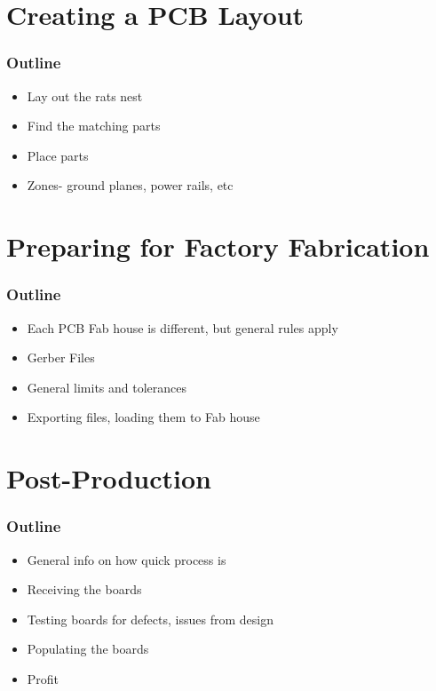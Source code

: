 \documentclass[]{beamer}
\begin{document}
\section[Layout]{Creating a PCB Layout}
\begin{frame}
    \frametitle{\insertsection{} Outline}
    \begin{itemize}
        \item Lay out the rats nest
        \item Find the matching parts
        \item Place parts
        \item Zones- ground planes, power rails, etc
    \end{itemize}
\end{frame}

\section[Fabrication]{Preparing for Factory Fabrication}
\begin{frame}
    \frametitle{\insertsection{} Outline}
    \begin{itemize}
        \item Each PCB Fab house is different, but general rules apply
        \item Gerber Files
        \item General limits and tolerances
        \item Exporting files, loading them to Fab house
    \end{itemize}
\end{frame}

\section[Post-Production]{Post-Production}
\begin{frame}
    \frametitle{\insertsection{} Outline}
    \begin{itemize}
        \item General info on how quick process is
        \item Receiving the boards
        \item Testing boards for defects, issues from design
        \item Populating the boards
        \item Profit
    \end{itemize}
\end{frame}
\end{document}
